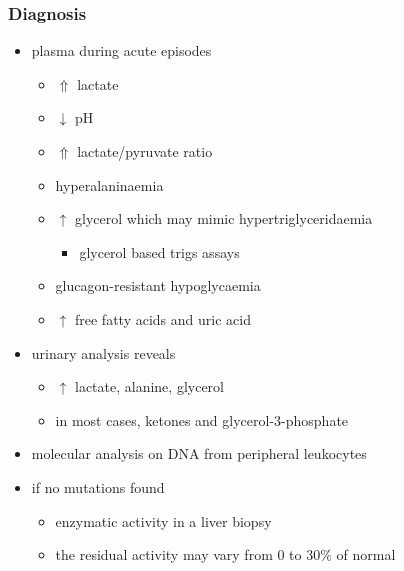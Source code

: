 \documentclass{scrartcl}
\begin{document}
\subsubsection{Diagnosis}
\label{sec:orga7102bc}
\begin{itemize}
\item plasma during acute episodes
\begin{itemize}
\item \(\Uparrow\) lactate
\item \(\downarrow\) pH
\item \(\Uparrow\) lactate/pyruvate ratio
\item hyperalaninaemia
\item \(\uparrow\) glycerol which may mimic hypertriglyceridaemia
\begin{itemize}
\item glycerol based trigs assays
\end{itemize}
\item glucagon-resistant hypoglycaemia
\item \(\uparrow\) free fatty acids and uric acid
\end{itemize}
\item urinary analysis reveals
\begin{itemize}
\item \(\uparrow\) lactate, alanine, glycerol
\item in most cases, ketones and glycerol-3-phosphate
\end{itemize}

\item molecular analysis on DNA from peripheral leukocytes
\item if no mutations found
\begin{itemize}
\item enzymatic activity in a liver biopsy
\item the residual activity may vary from 0 to 30\% of normal
\end{itemize}
\end{itemize}
\end{document}
